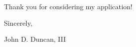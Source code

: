 \documentclass[]{article}
\begin{document}
Thank you for considering my application!

Sincerely,

John D. Duncan, III










\end{document}
